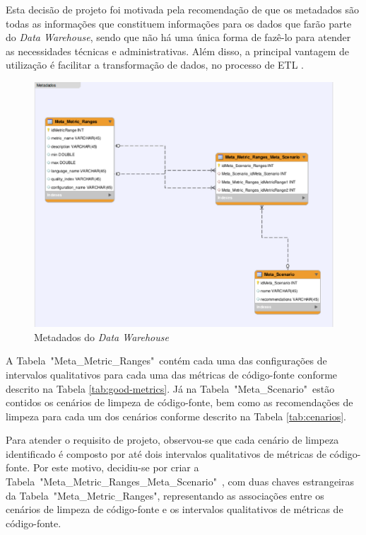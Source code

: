 Esta decisão de projeto foi motivada pela recomendação de que os metadados são todas as informações que constituem informações para os dados que farão parte do \textit{Data Warehouse}, sendo que não há uma única forma de fazê-lo para atender as necessidades técnicas e administrativas. Além disso, a principal vantagem de utilização é facilitar a transformação de dados, no processo de ETL \cite{Kimball2002}.


\begin{figure}[ht!]
\centering
\includegraphics[keepaspectratio=false,scale=0.5]{figuras/metadados.eps}
\caption{Metadados do \textit{Data Warehouse}}
\label{fig:metadados}
\end{figure}
\FloatBarrier


A Tabela~"Meta\_Metric\_Ranges"~contém cada uma das configurações de intervalos qualitativos para cada uma das métricas de código-fonte conforme descrito na Tabela \ref{tab:good-metrics}. Já na Tabela~"Meta\_Scenario"~estão contidos os cenários de limpeza de código-fonte, bem como as recomendações de limpeza para cada um dos cenários conforme descrito na Tabela \ref{tab:cenarios}. 


Para atender o requisito de projeto, observou-se que cada cenário de limpeza identificado é composto por até dois intervalos qualitativos de métricas de código-fonte. Por este motivo, decidiu-se por criar a Tabela~"Meta\_Metric\_Ranges\_Meta\_Scenario"~, com duas chaves estrangeiras da Tabela~"Meta\_Metric\_Ranges", representando as associações entre os cenários de limpeza de código-fonte e os intervalos qualitativos de métricas de código-fonte.



